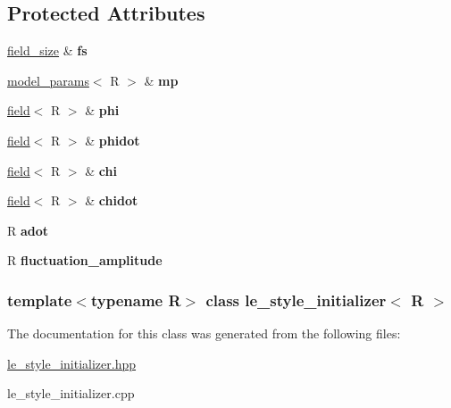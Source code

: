 \subsection*{Protected Attributes}
\begin{DoxyCompactItemize}
\item 
\hypertarget{classle__style__initializer_a62611c6bf34270cc824bff07ae43560d}{
\hyperlink{structfield__size}{field\_\-size} \& {\bfseries fs}}
\label{classle__style__initializer_a62611c6bf34270cc824bff07ae43560d}

\item 
\hypertarget{classle__style__initializer_a73c082652784c51599ead4c6608556a7}{
\hyperlink{structmodel__params}{model\_\-params}$<$ R $>$ \& {\bfseries mp}}
\label{classle__style__initializer_a73c082652784c51599ead4c6608556a7}

\item 
\hypertarget{classle__style__initializer_a82ffd836af9e74646e87a0a8ec2b19ae}{
\hyperlink{classfield}{field}$<$ R $>$ \& {\bfseries phi}}
\label{classle__style__initializer_a82ffd836af9e74646e87a0a8ec2b19ae}

\item 
\hypertarget{classle__style__initializer_a9a1febad9cec5260d4feda55156277ba}{
\hyperlink{classfield}{field}$<$ R $>$ \& {\bfseries phidot}}
\label{classle__style__initializer_a9a1febad9cec5260d4feda55156277ba}

\item 
\hypertarget{classle__style__initializer_aac6d2b31590a8f21ffbc98a678e35c5f}{
\hyperlink{classfield}{field}$<$ R $>$ \& {\bfseries chi}}
\label{classle__style__initializer_aac6d2b31590a8f21ffbc98a678e35c5f}

\item 
\hypertarget{classle__style__initializer_afda2afd595b91480ac13655fbf3cd891}{
\hyperlink{classfield}{field}$<$ R $>$ \& {\bfseries chidot}}
\label{classle__style__initializer_afda2afd595b91480ac13655fbf3cd891}

\item 
\hypertarget{classle__style__initializer_a8023c235401ca9873ae08ab3b73cf348}{
R {\bfseries adot}}
\label{classle__style__initializer_a8023c235401ca9873ae08ab3b73cf348}

\item 
\hypertarget{classle__style__initializer_ab5113f6fdc28a74399d2ec26d8875e45}{
R {\bfseries fluctuation\_\-amplitude}}
\label{classle__style__initializer_ab5113f6fdc28a74399d2ec26d8875e45}

\end{DoxyCompactItemize}
\subsubsection*{template$<$typename R$>$ class le\_\-style\_\-initializer$<$ R $>$}



The documentation for this class was generated from the following files:\begin{DoxyCompactItemize}
\item 
\hyperlink{le__style__initializer_8hpp}{le\_\-style\_\-initializer.hpp}\item 
le\_\-style\_\-initializer.cpp\end{DoxyCompactItemize}
